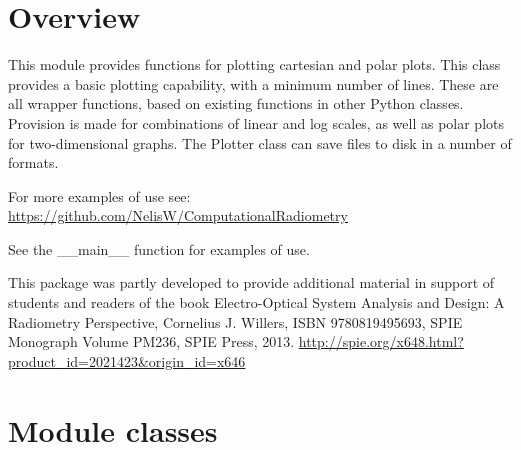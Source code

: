 \documentclass[a4paper,10pt,english]{sphinxmanual}
\begin{document}
\section{Overview}
\label{ryplot:overview}\label{ryplot:module-pyradi.ryplot}
This module provides functions for plotting cartesian and polar plots.
This class provides a basic plotting capability, with a minimum
number of lines. These are all wrapper functions,
based on existing functions in other Python classes.
Provision is made for combinations of linear and log scales, as well
as polar plots for two-dimensional graphs.
The Plotter class can save files to disk in a number of formats.

For more examples of use see:
\href{https://github.com/NelisW/ComputationalRadiometry}{https://github.com/NelisW/ComputationalRadiometry}

See the \_\_main\_\_ function for examples of use.

This package was partly developed to provide additional material in support of students 
and readers of the book Electro-Optical System Analysis and Design: A Radiometry 
Perspective,  Cornelius J. Willers, ISBN 9780819495693, SPIE Monograph Volume
PM236, SPIE Press, 2013.  \href{http://spie.org/x648.html?product\_id=2021423\&origin\_id=x646}{http://spie.org/x648.html?product\_id=2021423\&origin\_id=x646}


\section{Module classes}
\label{ryplot:module-classes}
\end{document}
